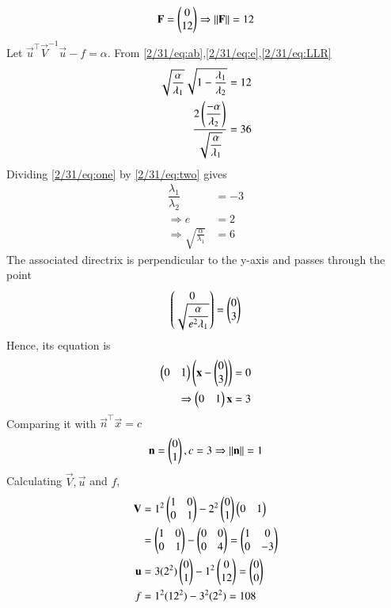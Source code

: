 \begin{align}
    \mathbf{F} =\begin{pmatrix}0\\ 12\end{pmatrix}\Rightarrow\left\lVert\mathbf{F}\right\rVert=12
\end{align}
Let $\vec{u}^{\top}\vec{V}^{-1}\vec{u}-f=\alpha$. From \eqref{2/31/eq:ab},\eqref{2/31/eq:e},\eqref{2/31/eq:LLR}
\begin{align}
    \sqrt{\dfrac{\alpha}{\lambda_1}}\sqrt{1-\frac{\lambda_1}{\lambda_2}}=12\label{2/31/eq:one}\\
    \dfrac{2\left(\dfrac{-\alpha}{\lambda_2}\right)}{\sqrt{\dfrac{\alpha}{\lambda_1}}}=36\label{2/31/eq:two}
\end{align}
Dividing \eqref{2/31/eq:one} by \eqref{2/31/eq:two} gives
\begin{align}
    \dfrac{\lambda_1}{\lambda_2}&=-3\\
    \Rightarrow e&=2\label{2/31/eq:q}\\
    \Rightarrow \sqrt{\frac{\alpha}{\lambda_1}}&=6\label{2/31/eq:w}
\end{align}
The associated directrix is perpendicular to the y-axis and passes through the point
\begin{align}
\begin{pmatrix}0\\\sqrt{\dfrac{\alpha}{e^2\lambda_1}}\end{pmatrix}=\begin{pmatrix}0\\3\end{pmatrix}
\end{align}
Hence, its equation is
\begin{align}
    \begin{pmatrix}0&1\end{pmatrix}\left(\mathbf{x}-\begin{pmatrix}0\\3\end{pmatrix}\right) &= 0\\
    \Rightarrow \begin{pmatrix}0&1\end{pmatrix}\mathbf{x} &= 3
\end{align}
Comparing it with $\vec{n}^{\top}\vec{x} = c$
\begin{align}
    \mathbf{n} = \begin{pmatrix}0\\1\end{pmatrix}, c = 3\Rightarrow \left\lVert\mathbf{n}\right\rVert = 1
\end{align}
Calculating $\vec{V}, \vec{u}$ and $f$,
\begin{align}
    \mathbf{V}&=1^2\begin{pmatrix}1&0\\0&1\end{pmatrix} - 2^2\begin{pmatrix}0\\1\end{pmatrix}\begin{pmatrix}0&1\end{pmatrix}\\
    &=\begin{pmatrix}1&0\\0&1\end{pmatrix}-\begin{pmatrix}0&0\\0&4\end{pmatrix}=\begin{pmatrix}1&0\\0&-3\end{pmatrix}\\
    \mathbf{u}&= 3(2^2)\begin{pmatrix}0\\1\end{pmatrix} - 1^2\begin{pmatrix}0\\12\end{pmatrix}=\begin{pmatrix}0\\0\end{pmatrix}\\
    f &= 1^2(12^2) - 3^2(2^2)= 108
\end{align}
